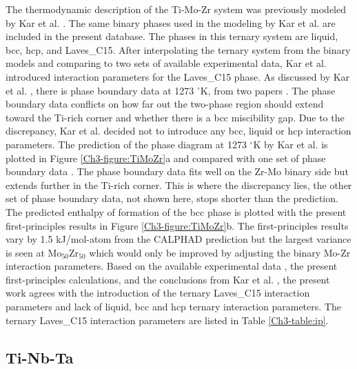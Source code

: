 The thermodynamic description of the Ti-Mo-Zr system was previously modeled by Kar et al. \cite{Kar2008}. The same binary phases used in the modeling by Kar et al. are included in the present database. The phases in this ternary system are liquid, bcc, hcp, and Laves\_C15. After interpolating the ternary system from the binary models and comparing to two sets of available experimental data, Kar et al. \cite{Kar2008} introduced interaction parameters for the Laves\_C15 phase. As discussed by Kar et al. \cite{Kar2008}, there is phase boundary data at 1273 $^{\circ}$K, from two papers \cite{Kar2008}. The phase boundary data conflicts on how far out the two-phase region should extend toward the Ti-rich corner and whether there is a bcc miscibility gap. Due to the discrepancy, Kar et al. \cite{Kar2008} decided not to introduce any bcc, liquid or hcp interaction parameters. The prediction of the phase diagram at 1273 $^{\circ}$K by Kar et al. \cite{Kar2008} is plotted in Figure \ref{Ch3-figure:TiMoZr}a and compared with one set of phase boundary data \cite{Kar2008}. The phase boundary data fits well on the Zr-Mo binary side but extends further in the Ti-rich corner. This is where the discrepancy lies, the other set of phase boundary data, not shown here, stops shorter than the prediction. The predicted enthalpy of formation of the bcc phase is plotted with the present first-principles results in Figure \ref{Ch3-figure:TiMoZr}b. The first-principles results vary by 1.5 kJ/mol-atom from the CALPHAD prediction but the largest variance is seen at Mo$_{50}$Zr$_{50}$ which would only be improved by adjusting the binary Mo-Zr interaction parameters. Based on the available experimental data \cite{Kar2008}, the present first-principles calculations, and the conclusions from Kar et al. \cite{Kar2008}, the present work agrees with the introduction of the ternary Laves\_C15 interaction parameters and lack of liquid, bcc and hcp ternary interaction parameters. The ternary Laves\_C15 interaction parameters are listed in Table \ref{Ch3-table:ip}.

\subsection{Ti-Nb-Ta}

